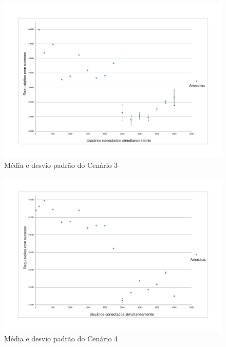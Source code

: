         \begin{figure}[H]
    \centering
    \includegraphics[scale=0.5]{imagens/dvp3.pdf}
    \caption{Média e desvio padrão do Cenário 3}
    \label{fig:dvp3}
    \end{figure}
    
        \begin{figure}[H]
    \centering
    \includegraphics[scale=0.5]{imagens/dvp4.pdf}
    \caption{Média e desvio padrão do Cenário 4}
    \label{fig:dvp4}
    \end{figure}
    
